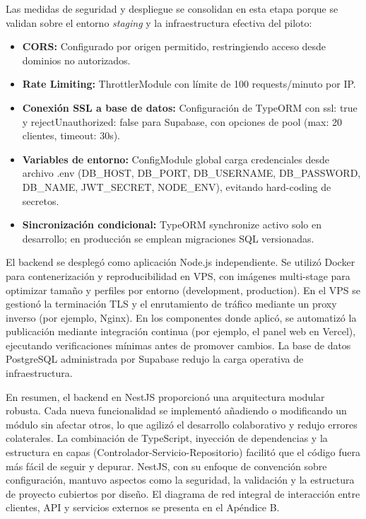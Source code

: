   Las medidas de seguridad y despliegue se consolidan en esta etapa porque se validan sobre el entorno \textit{staging} y la infraestructura efectiva del piloto:
  \begin{itemize}
    \item \textbf{CORS:} Configurado por origen permitido, restringiendo acceso desde dominios no autorizados.
    \item \textbf{Rate Limiting:} ThrottlerModule con límite de 100 requests/minuto por IP.
    \item \textbf{Conexión SSL a base de datos:} Configuración de TypeORM con ssl: true y rejectUnauthorized: false para Supabase, con opciones de pool (max: 20 clientes, timeout: 30s).
    \item \textbf{Variables de entorno:} ConfigModule global carga credenciales desde archivo .env (DB\_HOST, DB\_PORT, DB\_USERNAME, DB\_PASSWORD, DB\_NAME, JWT\_SECRET, NODE\_ENV), evitando hard-coding de secretos.
    \item \textbf{Sincronización condicional:} TypeORM synchronize activo solo en desarrollo; en producción se emplean migraciones SQL versionadas.
  \end{itemize}

  El backend se desplegó como aplicación Node.js independiente. Se utilizó Docker para contenerización y reproducibilidad en VPS, con imágenes multi-stage para optimizar tamaño y perfiles por entorno (development, production). En el VPS se gestionó la terminación TLS y el enrutamiento de tráfico mediante un proxy inverso (por ejemplo, Nginx). En los componentes donde aplicó, se automatizó la publicación mediante integración continua (por ejemplo, el panel web en Vercel), ejecutando verificaciones mínimas antes de promover cambios. La base de datos PostgreSQL administrada por Supabase redujo la carga operativa de infraestructura.

  En resumen, el backend en NestJS proporcionó una arquitectura modular robusta. Cada nueva funcionalidad se implementó añadiendo o modificando un módulo sin afectar otros, lo que agilizó el desarrollo colaborativo y redujo errores colaterales. La combinación de TypeScript, inyección de dependencias y la estructura en capas (Controlador-Servicio-Repositorio) facilitó que el código fuera más fácil de seguir y depurar. NestJS, con su enfoque de convención sobre configuración, mantuvo aspectos como la seguridad, la validación y la estructura de proyecto cubiertos por diseño.
  El diagrama de red integral de interacción entre clientes, API y servicios externos se presenta en el Apéndice B.

